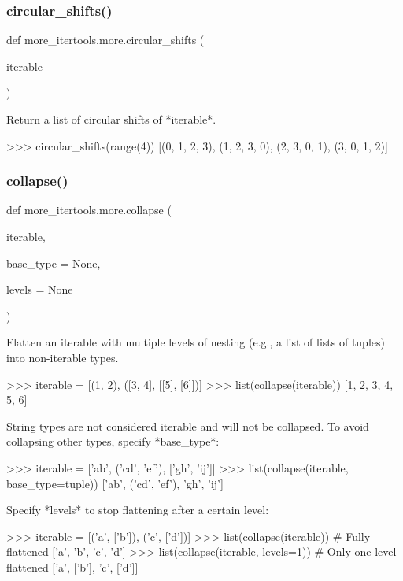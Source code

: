 \subsubsection{\texorpdfstring{circular\+\_\+shifts()}{circular\_shifts()}}
{\footnotesize\ttfamily def more\+\_\+itertools.\+more.\+circular\+\_\+shifts (\begin{DoxyParamCaption}\item[{}]{iterable }\end{DoxyParamCaption})}

\begin{DoxyVerb}Return a list of circular shifts of *iterable*.

    >>> circular_shifts(range(4))
    [(0, 1, 2, 3), (1, 2, 3, 0), (2, 3, 0, 1), (3, 0, 1, 2)]
\end{DoxyVerb}
 \mbox{\label{namespacemore__itertools_1_1more_a59642897c4fa29478c401846a74410b8}} 
\subsubsection{\texorpdfstring{collapse()}{collapse()}}
{\footnotesize\ttfamily def more\+\_\+itertools.\+more.\+collapse (\begin{DoxyParamCaption}\item[{}]{iterable,  }\item[{}]{base\+\_\+type = {\ttfamily None},  }\item[{}]{levels = {\ttfamily None} }\end{DoxyParamCaption})}

\begin{DoxyVerb}Flatten an iterable with multiple levels of nesting (e.g., a list of
lists of tuples) into non-iterable types.

    >>> iterable = [(1, 2), ([3, 4], [[5], [6]])]
    >>> list(collapse(iterable))
    [1, 2, 3, 4, 5, 6]

String types are not considered iterable and will not be collapsed.
To avoid collapsing other types, specify *base_type*:

    >>> iterable = ['ab', ('cd', 'ef'), ['gh', 'ij']]
    >>> list(collapse(iterable, base_type=tuple))
    ['ab', ('cd', 'ef'), 'gh', 'ij']

Specify *levels* to stop flattening after a certain level:

>>> iterable = [('a', ['b']), ('c', ['d'])]
>>> list(collapse(iterable))  # Fully flattened
['a', 'b', 'c', 'd']
>>> list(collapse(iterable, levels=1))  # Only one level flattened
['a', ['b'], 'c', ['d']]\end{DoxyVerb}
 \mbox{\label{namespacemore__itertools_1_1more_a9a4d717c2317a68b98a03ad1ca1c663b}} 
